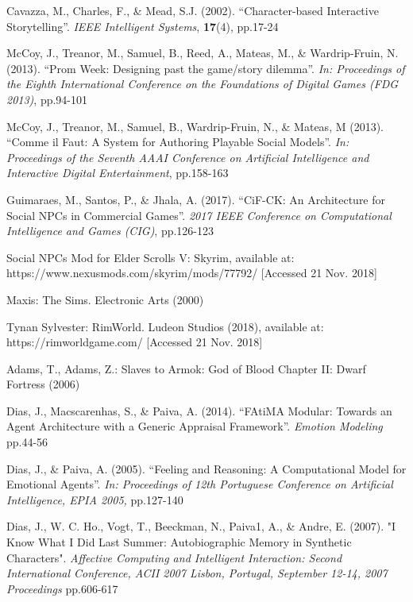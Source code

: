 \documentclass{sig-alternate-05-2015}
\begin{document}
\begin{thebibliography}{20}
Cavazza, M., Charles, F., \& Mead, S.J. (2002).
``Character-based Interactive Storytelling''.
\textit{IEEE Intelligent Systems}, \textbf{17}(4), pp.17-24

McCoy, J., Treanor, M., Samuel, B., Reed, A., Mateas, M., \& Wardrip-Fruin, N. (2013).
``Prom Week: Designing past the game/story dilemma''.
\textit{In: Proceedings of the Eighth International Conference on the Foundations of Digital Games (FDG 2013)}, pp.94-101

McCoy, J., Treanor, M., Samuel, B., Wardrip-Fruin, N., \& Mateas, M (2013).
``Comme il Faut: A System for Authoring Playable Social Models''.
\textit{In: Proceedings of the Seventh AAAI Conference on Artificial Intelligence and Interactive Digital Entertainment}, pp.158-163

Guimaraes, M., Santos, P., \& Jhala, A. (2017).
``CiF-CK: An Architecture for Social NPCs in Commercial Games''.
\textit{2017 IEEE Conference on Computational Intelligence and Games (CIG)}, pp.126-123

Social NPCs Mod for Elder Scrolls V: Skyrim, available at: https://www.nexusmods.com/skyrim/mods/77792/ [Accessed 21 Nov. 2018]

Maxis: The Sims. Electronic Arts (2000)

Tynan Sylvester: RimWorld. Ludeon Studios (2018), available at: https://rimworldgame.com/ [Accessed 21 Nov. 2018]

Adams, T., Adams, Z.: Slaves to Armok: God of Blood Chapter II: Dwarf Fortress (2006)

Dias, J., Macscarenhas, S., \& Paiva, A. (2014).
``FAtiMA Modular: Towards an Agent Architecture with
a Generic Appraisal Framework''.
\textit{Emotion Modeling} pp.44-56

Dias, J., \& Paiva, A. (2005).
``Feeling and Reasoning: A Computational Model for Emotional Agents''.
\textit{In: Proceedings of 12th Portuguese Conference on Artificial Intelligence, EPIA 2005,} pp.127-140

Dias, J., W. C. Ho., Vogt, T., Beeckman, N., Paiva1, A., \& Andre, E. (2007).
"I Know What I Did Last Summer: Autobiographic Memory in Synthetic Characters".
\textit{Affective Computing and Intelligent Interaction: Second International Conference, ACII 2007 Lisbon, Portugal, September 12-14, 2007 Proceedings} pp.606-617


\end{thebibliography}
\end{document}
